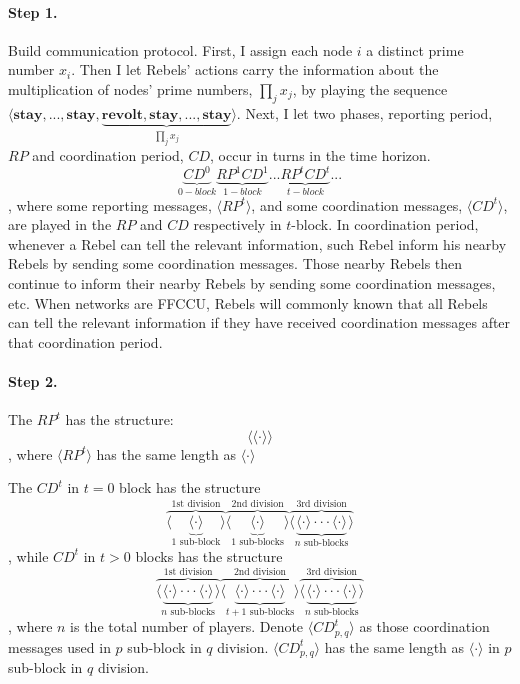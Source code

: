 \documentclass[12pt,letter]{article}
\theoremstyle{definition}
\theoremstyle{remark}
\theoremstyle{claim}
\begin{document}
\paragraph{Step 1.}
Build {communication protocol}. First, I assign each node $i$ a distinct prime number $x_i$. Then I let Rebels' actions carry the information about the multiplication of nodes' prime numbers, $\prod_{j}x_j$, by playing the sequence $\langle \textbf{stay},...,\textbf{stay},\underbrace{\textbf{revolt},\textbf{stay},...,\textbf{stay}}_{\prod_{j}x_j}\rangle$. Next, I let two phases, {reporting period, $RP$} and {coordination period, $CD$}, occur in turns in the time horizon. \[\underbrace{CD^0}_{0-block}\underbrace{RP^1CD^1}_{1-block}...\underbrace{RP^tCD^t}_{t-block}...\], where some {reporting messages}, $\langle RP^t \rangle$, and some {coordination messages}, $\langle CD^t \rangle$, are played in the $RP$ and $CD$ respectively in $t$-block. In coordination period, whenever a Rebel can tell the relevant information, such Rebel inform his nearby Rebels by sending some coordination messages. Those nearby Rebels then continue to inform their nearby Rebels by sending some coordination messages, etc. When networks are FFCCU, Rebels will commonly known that all Rebels can tell the relevant information if they have received coordination messages after that coordination period.

\paragraph{Step 2.} The $RP^t$ has the structure:
\[\langle \langle \cdot \rangle \rangle\]
, where $\langle RP^t \rangle$ has the same length as $\langle \cdot \rangle$

The $CD^t$ in $t=0$ block has the structure
\[\overbrace{\langle\underbrace{\langle \cdot \rangle }_{\text{$1$ sub-block}}\rangle}^{\text{1st division}} \overbrace{\langle\underbrace{\langle \cdot \rangle }_{\text{$1$ sub-blocks}} \rangle}^{\text{2nd division}} \overbrace{\langle\underbrace{\langle \cdot \rangle \cdot \cdot \cdot \langle \cdot \rangle}_{\text{$n$ sub-blocks}}\rangle}^{\text{3rd division}}\] 
, while $CD^t$ in $t>0$ blocks has the structure 
\[\overbrace{\langle\underbrace{\langle \cdot \rangle \cdot \cdot \cdot \langle \cdot \rangle}_{\text{$n$ sub-blocks}}\rangle}^{\text{1st division}} \overbrace{\langle\underbrace{\langle \cdot \rangle \cdot \cdot \cdot \langle \cdot \rangle}_{\text{$t+1$ sub-blocks}} \rangle}^{\text{2nd division}} \overbrace{\langle\underbrace{\langle \cdot \rangle \cdot \cdot \cdot \langle \cdot \rangle}_{\text{$n$ sub-blocks}}\rangle}^{\text{3rd division}}\] 
, where $n$ is the total number of players. Denote $\langle CD^t_{p,q} \rangle$ as those coordination messages used in $p$ sub-block in $q$ division. $\langle CD^t_{p,q} \rangle$ has the same length as $\langle \cdot \rangle$ in $p$ sub-block in $q$ division.
\end{document}
